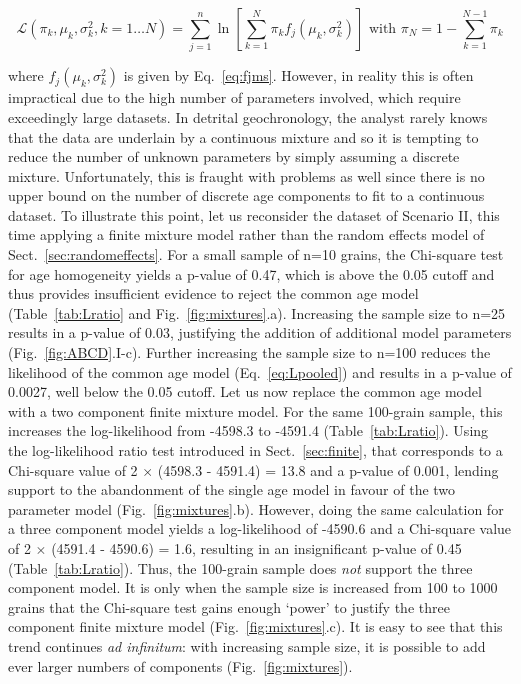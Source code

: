 \documentclass{article}
\begin{document}
\begin{equation}
\mathcal{L}(\pi_{k},\mu_{k},\sigma^2_{k}, k = 1 \ldots N) = 
\sum\limits_{j=1}^{n} \ln \left[
\sum\limits_{k=1}^{N} \pi_k f_j(\mu_k,\sigma^2_k) 
\right]
\mbox{~with~} \pi_N = 1-\sum\limits_{k=1}^{N-1}\pi_k
\label{eq:Lcontmix}
\end{equation}

where $f_j(\mu_k,\sigma_k^2)$ is given by Eq.~\ref{eq:fjms}. However,
in reality this is often impractical due to the high number of
parameters involved, which require exceedingly large datasets. In
detrital geochronology, the analyst rarely knows that the data are
underlain by a continuous mixture and so it is tempting to reduce the
number of unknown parameters by simply assuming a discrete
mixture. Unfortunately, this is fraught with problems as well since
there is no upper bound on the number of discrete age components to
fit to a continuous dataset. To illustrate this point, let us
reconsider the dataset of Scenario II, this time applying a finite
mixture model rather than the random effects model of
Sect.~\ref{sec:randomeffects}.  For a small sample of n=10 grains, the
Chi-square test for age homogeneity yields a p-value of 0.47, which is
above the 0.05 cutoff and thus provides insufficient evidence to
reject the common age model (Table~\ref{tab:Lratio} and
Fig.~\ref{fig:mixtures}.a).  Increasing the sample size to n=25
results in a p-value of 0.03, justifying the addition of additional
model parameters (Fig.~\ref{fig:ABCD}.I-c). Further increasing the
sample size to n=100 reduces the likelihood of the common age model
(Eq.~\ref{eq:Lpooled}) and results in a p-value of 0.0027, well below
the 0.05 cutoff. Let us now replace the common age model with a two
component finite mixture model. For the same 100-grain sample, this
increases the log-likelihood from -4598.3 to -4591.4
(Table~\ref{tab:Lratio}). Using the log-likelihood ratio test
introduced in Sect.~\ref{sec:finite}, that corresponds to a Chi-square
value of 2 $\times$ (4598.3 - 4591.4) = 13.8 and a p-value of 0.001,
lending support to the abandonment of the single age model in favour
of the two parameter model (Fig.~\ref{fig:mixtures}.b).  However,
doing the same calculation for a three component model yields a
log-likelihood of -4590.6 and a Chi-square value of 2 $\times$ (4591.4
- 4590.6) = 1.6, resulting in an insignificant p-value of 0.45
(Table~\ref{tab:Lratio}). Thus, the 100-grain sample does \emph{not}
support the three component model. It is only when the sample size is
increased from 100 to 1000 grains that the Chi-square test gains
enough `power' to justify the three component finite mixture model
(Fig.~\ref{fig:mixtures}.c). It is easy to see that this trend
continues \emph{ad infinitum}: with increasing sample size, it is
possible to add ever larger numbers of components
(Fig.~\ref{fig:mixtures}).\\
\end{document}
